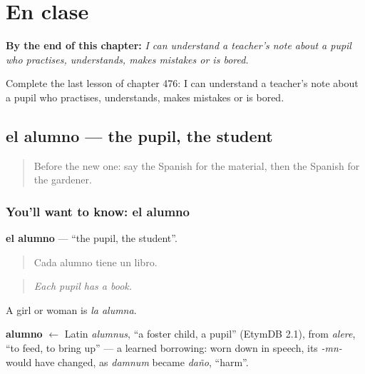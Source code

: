 
\chapter{En clase}
\label{ch:es-en-clase}

\begin{chapteropening}
\textbf{By the end of this chapter:} \emph{I can understand a teacher's note about a pupil who practises, understands, makes mistakes or is bored.}

Complete the last lesson of chapter 476: I can understand a teacher's note about a pupil who practises, understands, makes mistakes or is bored.
\end{chapteropening}

\section[el alumno]{el alumno — the pupil, the student}

\label{lesson:ES-C476-alumno}



\begin{quote}
Before the new one: say the Spanish for the material, then the Spanish for the gardener.
\end{quote}

\subsection*{You'll want to know: el alumno}
\textbf{el alumno} — \textquotedblleft{}the pupil, the student\textquotedblright{}.

\begin{quote}
Cada alumno tiene un libro.
\end{quote}

\begin{quote}
\emph{Each pupil has a book.}
\end{quote}

A girl or woman is \emph{la alumna}.

\begin{cousinweb}
\textbf{alumno} $\leftarrow$ Latin \emph{alumnus}, \textquotedblleft{}a foster child, a pupil\textquotedblright{} (EtymDB 2.1), from \emph{alere}, \textquotedblleft{}to feed, to bring up\textquotedblright{} — a learned borrowing: worn down in speech, its \emph{-mn-} would have changed, as \emph{damnum} became \emph{daño}, \textquotedblleft{}harm\textquotedblright{}.
\end{cousinweb}

